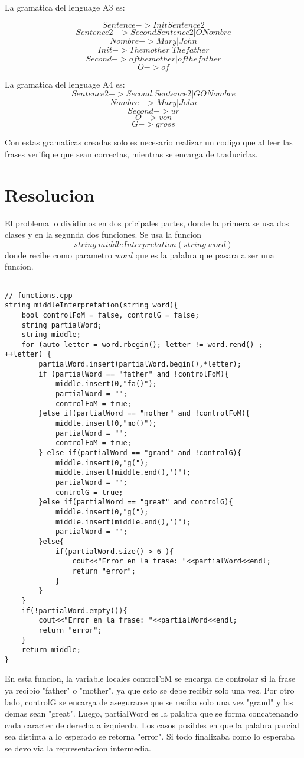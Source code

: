 \documentclass[conference]{IEEEtran}
\begin{document}
La gramatica del lenguage A3 es:

$$Sentence    -> Init Sentence2$$
$$Sentence2   -> Second Sentence2 | O Nombre $$
$$Nombre      -> Mary | John$$
$$Init        -> The mother | The father $$
$$Second      -> of the mother | of the father$$ 
$$O           -> of$$

La gramatica del lenguage A4 es:
$$Sentence2   -> Second.Sentence2 | G O Nombre $$
$$Nombre      -> Mary | John$$
$$Second      -> ur $$ 
$$O           -> von$$
$$G -> gross$$

Con estas gramaticas creadas solo es necesario realizar un codigo que al leer las frases verifique que sean correctas, mientras se encarga de traducirlas.

\section{Resolucion}

El problema lo dividimos en dos pricipales partes, donde la primera se usa dos clases y en la segunda dos funciones. Se usa la funcion $$string \  middleInterpretation(string \ word)$$
donde recibe como parametro $word$ que es la palabra que pasara a ser una funcion. 

\begin{lstlisting}

// functions.cpp
string middleInterpretation(string word){
	bool controlFoM = false, controlG = false;
	string partialWord;
	string middle;
	for (auto letter = word.rbegin(); letter != word.rend() ; ++letter) {
		partialWord.insert(partialWord.begin(),*letter);
		if (partialWord == "father" and !controlFoM){
			middle.insert(0,"fa()");
			partialWord = "";
			controlFoM = true;
		}else if(partialWord == "mother" and !controlFoM){
			middle.insert(0,"mo()");
			partialWord = "";
			controlFoM = true;
		} else if(partialWord == "grand" and !controlG){
			middle.insert(0,"g(");
			middle.insert(middle.end(),')');
			partialWord = "";
			controlG = true;
		}else if(partialWord == "great" and controlG){
			middle.insert(0,"g(");
			middle.insert(middle.end(),')');
			partialWord = "";
		}else{
			if(partialWord.size() > 6 ){
				cout<<"Error en la frase: "<<partialWord<<endl;
				return "error";
			}
		}
	}
	if(!partialWord.empty()){
		cout<<"Error en la frase: "<<partialWord<<endl;
		return "error";
	}
	return middle;
}

\end{lstlisting}
	
En esta funcion, la variable locales controFoM se encarga de controlar si la frase ya recibio "father" o "mother", ya que esto se debe recibir solo una vez. Por otro lado, controlG se encarga de asegurarse que se reciba solo una vez "grand" y los demas sean "great". Luego, partialWord es la palabra que se forma concatenando cada caracter de derecha a izquierda. Los casos posibles en que la palabra parcial sea distinta a lo esperado se retorna "error". Si todo finalizaba como lo esperaba se devolvia la representacion intermedia.
\end{document}
